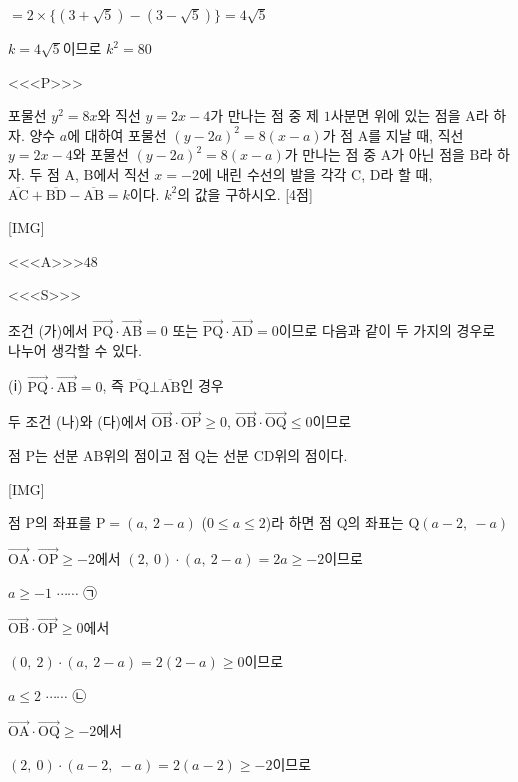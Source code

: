 \documentclass{oblivoir}
\begin{document}
$=2\times\{(3+\sqrt{5})-(3-\sqrt{5})\}$$=4\sqrt{5}$

$k=4\sqrt{5}$이므로 $k^{2}= 80$

<<<P>>>

포물선 $y^{2}= 8x$와 직선 $y = 2x - 4$가 만나는 점 중 제 $1$사분면 위에 있는 점을 $\mathrm{A}$라 하자. 양수 $a$에 대하여 포물선 $(y-2a)^{2}= 8(x- a)$가 점 $\mathrm{A}$를 지날 때, 직선 $y = 2x - 4$와 포물선 $(y-2a)^{2}= 8(x-a)$가 만나는 점 중 $\mathrm{A}$가 아닌 점을 $\mathrm{B}$라 하자. 두 점 $\mathrm{A}$, $\mathrm{B}$에서 직선 $x = -2$에 내린 수선의 발을 각각 $\mathrm{C}$, $\mathrm{D}$라 할 때, $\overline{\mathrm{AC}}+\overline{\mathrm{BD}}-\overline{\mathrm{AB}}= k$이다. $k^{2}$의 값을 구하시오. [4점]

[IMG]

<<<A>>>$48$

<<<S>>>

조건 (가)에서 $\overrightarrow{\mathrm{PQ}}\cdot\overrightarrow{\mathrm{AB}} = 0$ 또는 $\overrightarrow{\mathrm{PQ}}\cdot\overrightarrow{\mathrm{AD}} = 0$이므로 다음과 같이 두 가지의 경우로 나누어 생각할 수 있다. 

(ⅰ) $\overrightarrow{\mathrm{PQ}}\cdot\overrightarrow{\mathrm{AB}} = 0$, 즉 $\overline{\mathrm{PQ}}\bot\overline{\mathrm{AB}}$인 경우

두 조건 (나)와 (다)에서 $\overrightarrow{\mathrm{OB}}\cdot\overrightarrow{\mathrm{OP}}\ge 0$, $\overrightarrow{\mathrm{OB}}\cdot\overrightarrow{\mathrm{OQ}}\le 0$이므로

점 $\mathrm{P}$는 선분 $\mathrm{AB}$위의 점이고 점 $\mathrm{Q}$는 선분 $\mathrm{CD}$위의 점이다.

[IMG]

점 $\mathrm{P}$의 좌표를 $\mathrm{P}=(a ,\:  2-a)$ ($0\le a\le 2$)라 하면 점 $\mathrm{Q}$의 좌표는 $\mathrm{Q}(a-2 ,\:  -a)$

$\overrightarrow{\mathrm{OA}}\cdot\overrightarrow{\mathrm{OP}}\ge -2$에서 $(2,\: 0)\cdot(a ,\:  2- a)= 2a\ge -2$이므로 

$a\ge -1$ $\cdots\cdots$ ㉠

$\overrightarrow{\mathrm{OB}}\cdot\overrightarrow{\mathrm{OP}}\ge 0$에서 

$(0,\:2)\cdot(a,\: 2-a)= 2(2-a)\ge 0$이므로 

$a\le 2$ $\cdots\cdots$ ㉡

$\overrightarrow{\mathrm{OA}}\cdot\overrightarrow{\mathrm{OQ}}\ge -2$에서

$(2,\:  0)\cdot(a-2 ,\: - a)= 2(a- 2)\ge - 2$이므로 
\end{document}
